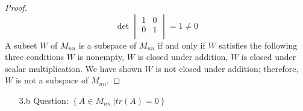 \documentclass[11pt]{article}
\newcommand{\DS} [1] {${\displaystyle #1}$}
\begin{document}
\begin{proof}
\begin{equation*}
        \end{equation*}
        \begin{equation*}
                \det
                \begin{vmatrix}
                        {1} & {0} \\
                        {0} & {1} \\
                \end{vmatrix}
                = 1 \neq 0
        \end{equation*}
        A subset $W$ of $M_{nn}$ is a subspace of $M_{nn}$ if and only if
        $W$ satisfies the following three conditions $W$ is nonempty,
        $W$ is closed under addition, $W$ is closed under scalar multiplication.
        We have shown $W$ is not closed under addition; therefore, $W$ is not a subspace of $M_{nn}$.
\end{proof}
\begin{enumerate}
        \item[3.b]Question: \DS{ \left\{A \in{M_{nn}} \ | tr (A) = 0 \right\}}
\end{enumerate}
\end{document}
